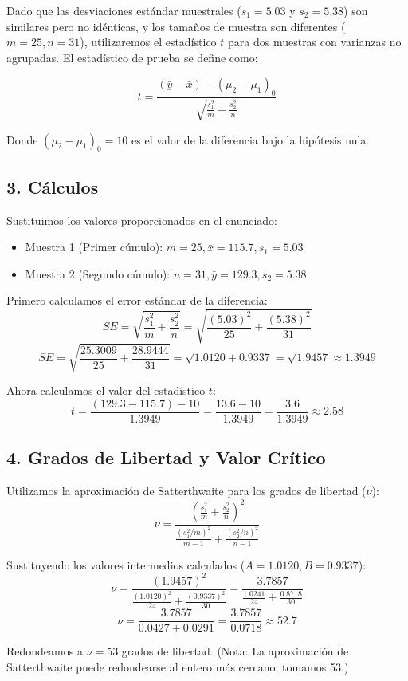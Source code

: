 \documentclass[12pt]{article}
\begin{document}
Dado que las desviaciones estándar muestrales ($s_1 = 5.03$ y $s_2 = 5.38$) son similares pero no idénticas, y los tamaños de muestra son diferentes ($m=25, n=31$), utilizaremos el estadístico $t$ para dos muestras con varianzas no agrupadas. El estadístico de prueba se define como:

$$ t = \frac{(\bar{y} - \bar{x}) - (\mu_2 - \mu_1)_0}{\sqrt{\frac{s_1^2}{m} + \frac{s_2^2}{n}}} $$

Donde $(\mu_2 - \mu_1)_0 = 10$ es el valor de la diferencia bajo la hipótesis nula.

\subsection*{3. Cálculos}

Sustituimos los valores proporcionados en el enunciado:
\begin{itemize}
    \item Muestra 1 (Primer cúmulo): $m = 25, \bar{x} = 115.7, s_1 = 5.03$
    \item Muestra 2 (Segundo cúmulo): $n = 31, \bar{y} = 129.3, s_2 = 5.38$
\end{itemize}

Primero calculamos el error estándar de la diferencia:
$$ SE = \sqrt{\frac{s_1^2}{m} + \frac{s_2^2}{n}} = \sqrt{\frac{(5.03)^2}{25} + \frac{(5.38)^2}{31}} $$
$$ SE = \sqrt{\frac{25.3009}{25} + \frac{28.9444}{31}} = \sqrt{1.0120 + 0.9337} = \sqrt{1.9457} \approx 1.3949 $$

Ahora calculamos el valor del estadístico $t$:
$$ t = \frac{(129.3 - 115.7) - 10}{1.3949} = \frac{13.6 - 10}{1.3949} = \frac{3.6}{1.3949} \approx 2.58 $$

\subsection*{4. Grados de Libertad y Valor Crítico}

Utilizamos la aproximación de Satterthwaite para los grados de libertad ($\nu$):
$$ \nu = \frac{\left( \frac{s_1^2}{m} + \frac{s_2^2}{n} \right)^2}{\frac{(s_1^2/m)^2}{m-1} + \frac{(s_2^2/n)^2}{n-1}} $$

Sustituyendo los valores intermedios calculados ($A = 1.0120, B = 0.9337$):
$$ \nu = \frac{(1.9457)^2}{\frac{(1.0120)^2}{24} + \frac{(0.9337)^2}{30}} = \frac{3.7857}{\frac{1.0241}{24} + \frac{0.8718}{30}} $$
$$ \nu = \frac{3.7857}{0.0427 + 0.0291} = \frac{3.7857}{0.0718} \approx 52.7 $$

Redondeamos a $\nu = 53$ grados de libertad. (Nota: La aproximación de Satterthwaite puede redondearse al entero más cercano; tomamos 53.)
\end{document}
